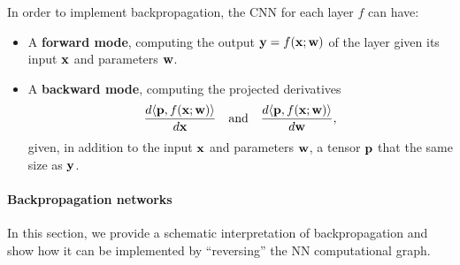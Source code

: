 In order to implement backpropagation, the CNN for each layer $f$ can have:
\begin{itemize}
	\item A \textbf{forward mode}, computing the output $\mathbf{y} = f(\mathbf{x};\mathbf{w})$ of the layer given its input $\mathbf{x}$ and parameters $\mathbf{w}$.
	\item A \textbf{backward mode}, computing the projected derivatives
	\[
	\frac{d \langle \mathbf{p}, f(\mathbf{x};\mathbf{w}) \rangle}
	{d \mathbf{x}}
	\quad\text{and}\quad
	\frac{d \langle \mathbf{p}, f(\mathbf{x};\mathbf{w}) \rangle}
	{d \mathbf{w}},
	\]
	given, in addition to the input $\mathbf{x}$ and parameters $\mathbf{w}$, a tensor $\mathbf{p}$ that the same size as $\mathbf{y}$.
\end{itemize}


\paragraph{Backpropagation networks}\label{s:bpnets}

In this section, we provide a schematic interpretation of backpropagation and show how it can be implemented by ``reversing'' the NN computational graph.

